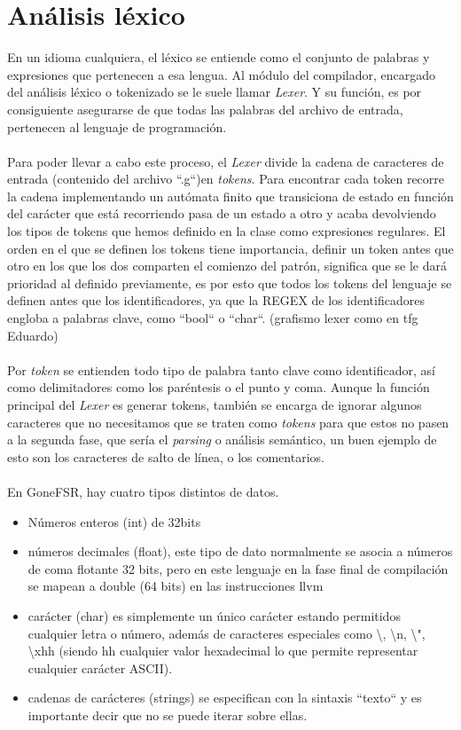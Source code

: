 \section{Análisis léxico}
En un idioma cualquiera,  el léxico se entiende como el conjunto de palabras y expresiones que pertenecen a esa lengua. Al módulo del compilador, encargado del análisis léxico o tokenizado se le suele llamar \textit{Lexer}. Y su función, es por consiguiente asegurarse de que todas las palabras del archivo de entrada, pertenecen al lenguaje de programación. \\\\
Para poder llevar a cabo este proceso, el \textit{Lexer} divide la cadena de caracteres de entrada (contenido del archivo ``.g``)en \textit{tokens}. Para encontrar cada token recorre la cadena implementando un autómata finito que transiciona de estado en función del carácter que está recorriendo pasa de un estado a otro y acaba devolviendo los tipos de tokens que hemos definido en la clase como expresiones regulares. El orden en el que se definen los tokens tiene importancia, definir un token antes que otro en los que los dos comparten el comienzo del patrón, significa que se le dará prioridad al definido previamente, es por esto que todos los tokens del lenguaje se definen antes que los identificadores, ya que la REGEX de los identificadores engloba a palabras clave, como ``bool`` o ``char``. (grafismo lexer como en tfg Eduardo)
\\\\
Por \textit{token} se entienden todo tipo de palabra tanto clave como identificador, así como delimitadores como los paréntesis o el punto y coma. Aunque la función principal del \textit{Lexer} es generar tokens, también se encarga de ignorar algunos caracteres que no necesitamos que se traten como \textit{tokens} para que estos no pasen a la segunda fase, que sería el \textit{parsing} o análisis semántico, un buen ejemplo de esto son los caracteres de salto de línea, o los comentarios.\\\\
En GoneFSR, hay cuatro tipos distintos de datos. 
\begin{itemize}
    \item{Números enteros (int) de 32bits}
    \item{números decimales (float), este tipo de dato normalmente se asocia a números de coma flotante 32 bits, pero en este lenguaje en la fase final de compilación se mapean a double (64 bits) en las instrucciones llvm}
    \item{carácter (char)  es simplemente un único carácter estando permitidos cualquier letra o número, además de caracteres especiales como \textbackslash, \textbackslash n, \textbackslash ", \textbackslash xhh (siendo hh cualquier valor hexadecimal lo que permite representar cualquier carácter ASCII).}
    \item{cadenas de carácteres (strings) se especifican con la sintaxis ``texto`` y es importante decir que no se puede iterar sobre ellas. }\\
\end{itemize}
